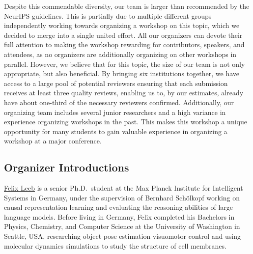 \documentclass{article}
\begin{document}
Despite this commendable diversity, our team is larger than recommended by the NeurIPS guidelines. This is partially due to multiple different groups independently working towards organizing a workshop on this topic, which we decided to merge into a single united effort. All our organizers can devote their full attention to making the workshop rewarding for contributors, speakers, and attendees, as no organizers are additionally organizing on other workshops in parallel.
However, we believe that for this topic, the size of our team is not only appropriate, but also beneficial. 
By bringing six institutions together, we have access to a large pool of potential reviewers ensuring that each submission receives at least three quality reviews, enabling us to, by our estimates, already have about one-third of the necessary reviewers confirmed.
Additionally, our organizing team includes several junior researchers and a high variance in experience organizing workshops in the past. This makes this workshop a unique opportunity for many students to gain valuable experience in organizing a workshop at a major conference.



\subsection{Organizer Introductions}

\href{https://felixludos.com/}{Felix Leeb} 
is a senior Ph.D.\ student at the Max Planck Institute for Intelligent Systems in Germany, under the supervision of Bernhard Schölkopf working on causal representation learning and evaluating the reasoning abilities of large language models. Before living in Germany, Felix completed his Bachelors in Physics, Chemistry, and Computer Science at the University of Washington in Seattle, USA, researching object pose estimation visuomotor control and using molecular dynamics simulations to study the structure of cell membranes.
\end{document}
